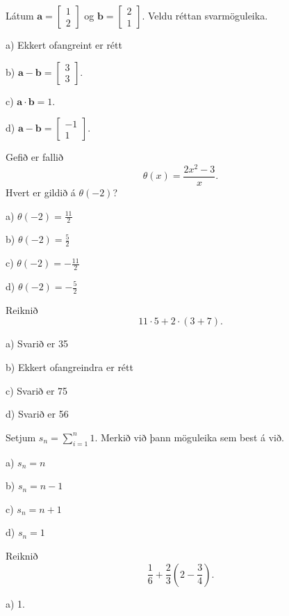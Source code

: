 \item Látum $ \mathbf{a} =
\left[
\begin{matrix}
1\\
2
\end{matrix}
\right]
$
og
$
\mathbf{b} =
\left[
\begin{matrix}
2\\
1
\end{matrix}
\right]
$.
Veldu réttan svarmöguleika.

a) Ekkert ofangreint er rétt

b) $ \mathbf{a} - \mathbf{b} = \left[  \begin{matrix} 3 \\ 3 \end{matrix} \right] $.

c) $ \mathbf{a} \cdot \mathbf{b} = 1$.

d) $ \mathbf{a} - \mathbf{b} = \left[  \begin{matrix} -1\\ 1 \end{matrix} \right] $. %


\item Gefið er fallið $$\displaystyle\theta(x)=\frac{2x^2-3}{x}.$$ Hvert er gildið á $\theta(-2)$?

a) $\theta(-2)=\frac{11}{2}$

b) $\theta(-2)=\frac{5}{2}$

c) $\theta(-2)=-\frac{11}{2}$

d) $\theta(-2)=-\frac{5}{2}$ %


\item Reiknið
$$
11 \cdot 5+2 \cdot  \left ( 3+7 \right ) .
$$
\newpage

a) Svarið er 35

b) Ekkert ofangreindra er rétt

c) Svarið er 75 %

d) Svarið er 56


\item Setjum $s_n = \sum_{i=1}^n 1$. Merkið við þann möguleika sem best á við.
\newpage

a) $s_n = n$ %

b) $s_n = n-1$

c) $s_n = n+1$

d) $s_n = 1$


\item Reiknið
\[
\frac{1}{6} + \frac{2}{3} \left( 2 - \frac{3}{4} \right).
\]

a) 1. %

